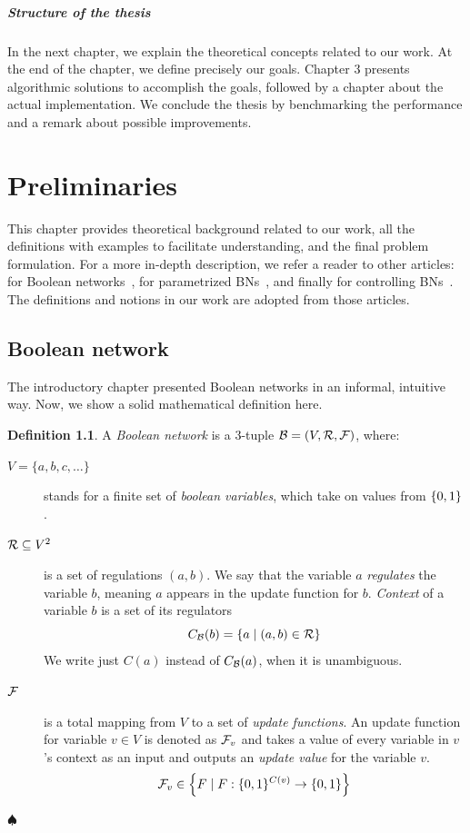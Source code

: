 \documentclass[
	digital, oneside, nosansbold, nocolorbold, nolot, nolof
]{fithesis4}
\theoremstyle{definition}
\newtheorem{definition}{Definition}
\theoremstyle{definition}
\newenvironment{ldefinition}
    {\begin{definition}}
	{\par\hspace{\stretch{1}}$\spadesuit$\hspace{\stretch{1}}
     \par\end{definition}}
\DeclarePairedDelimiter{\set}{\{}{\}}
\begin{document}
\paragraph{Structure of the thesis}

In the next chapter, we explain the theoretical concepts related to our work.
At the end of the chapter, we define precisely our goals. Chapter 3 presents
algorithmic solutions to accomplish the goals, followed by a chapter about the
actual implementation. We conclude the thesis by benchmarking the performance
and a remark about possible improvements.


\chapter{Preliminaries}

This chapter provides theoretical background related to our work, all the
definitions with examples to facilitate understanding, and the final problem
formulation. For a more in-depth description, we refer a reader to other
articles: for Boolean networks~\cite{concepts_bn}, for parametrized
BNs~\cite{kadlecaj_thesis}, and finally for controlling BNs~\cite{infl_max_BN}.
The definitions and notions in our work are adopted from those articles.

\section{Boolean network}

The introductory chapter presented Boolean networks in an informal, intuitive
way. Now, we show a solid mathematical definition here.

\begin{ldefinition} \label{def:BN}
A \emph{Boolean network} is a 3-tuple $\mathcal{B} = (V, \mathcal{R}, \mathcal{F})$,
where:
\begin{description}
\item[$V = \{a, b, c, \ldots \}$] stands for a finite set of
    \emph{boolean variables}, which take on values from $\set{0, 1}$.
\item[$\mathcal{R} \subseteq V^2$] is a set of regulations $(a, b)$. We say
    that the variable $a$ \emph{regulates} the variable $b$, meaning $a$
    appears in the update function for $b$. \emph{Context} of a variable
    $b$ is a set of its regulators
    \[C_{\BN{B}}(b) = \set{a \mid (a, b) \in \BNRs{R}}\]
    We write just $C(a)$ instead of $C_{\mathcal{B}}(a)$, when it is unambiguous.
\item[$\mathcal{F}$] is a total mapping from $V$ to a set of
    \emph{update functions}. An update function for variable $v \in V$ is
    denoted as $\mathcal{F}_v$ and takes a value of every variable in $v$'s
    context as an input and outputs an \emph{update value} for the variable
    $v$.
    \[
        \BNUFs{F}_v \in \set*{F \mid F: \set{0, 1}^{C(v)} \to \set{0, 1}}
    \]
\end{description}
\end{ldefinition}
\end{document}
